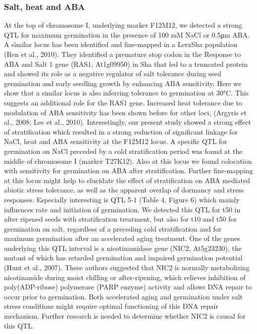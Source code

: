 \documentclass[8pt, twoside, a5paper]{report}
\begin{document}
\subsubsection{Salt, heat and ABA}
At the top of chromosome I, underlying marker F12M12, we detected a strong QTL for maximum germination in the presence of 100 mM NaCl or 0.5μm ABA. A similar
locus has been identified and fine-mapped in a LerxSha population (Ren et al., 2010). They identified a premature stop codon in the Response to ABA and Salt 1
gene (RAS1; At1g09950) in Sha that led to a truncated protein and showed its role as a negative regulator of salt tolerance during seed germination and early seedling growth by
enhancing ABA sensitivity. Here we show that a similar locus is also inferring tolerance to germination at 30°C. This suggests an additional role for the RAS1
gene. Increased heat tolerance due to modulation of ABA sensitivity has been shown before for other loci, (Argyris et al., 2008; Lee et al., 2010). Interestingly, our present study showed a strong
effect of stratification which resulted in a strong reduction of significant linkage for NaCl, heat and ABA sensitivity at the F12M12 locus. A specific QTL for germination on NaCl
preceded by a cold stratification period was found at the middle of chromosome I (marker T27K12). Also at this locus we found colocation with sensitivity for germination on ABA
after stratification. Further fine-mapping at this locus might help to elucidate the effect of stratification on ABA mediated abiotic stress tolerance, as well as the apparent overlap of
dormancy and stress responses. Especially interesting is QTL 5-1 (Table 4, Figure 6) which mainly influences rate and initiation of germination. We detected this QTL for t50 in after 
ripened seeds with stratification treatment, but also for t10 and t50 for germination on salt, regardless of a preceding cold stratification and for maximum germination after an accelerated aging
treatment. One of the genes underlying this QTL interval is a nicotinamidase gene (NIC2, At5g23230), the mutant of which has retarded germination and impaired germination potential 
(Hunt et al., 2007). These authors suggested that NIC2 is normally metabolizing nicotinamide during moist chilling or after-ripening, which relieves inhibition of poly(ADP-ribose) 
polymerase (PARP enzyme) activity and allows DNA repair to occur prior to germination. Both accelerated aging and germination under salt stress conditions might require optimal 
functioning of this DNA repair mechanism. Further research is needed to determine whether NIC2 is causal for this QTL.
\end{document}
